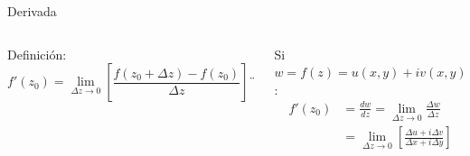 \documentclass[9pt, aspectratio=169]{beamer}
\begin{document}
\begin{frame}{Derivada}
 \begin{columns}
  \begin{alertblock}{Definición:}
   \[ f'(z_0) = \lim_{\Delta z \rightarrow 0} \left[ \frac{f(z_0 + \Delta z) - f(z_0)}{\Delta z} \right] ¨ \]
  \end{alertblock} \pause
  \vspace{2em}
  
  Si $w = f(z) = u(x, y) + i v(x, y)$:
  \begin{align*}
   f'(z_0) &= \frac{dw}{dz} = \lim_{\Delta z \rightarrow 0} \frac{\Delta w}{\Delta z} \\
           &= \lim_{\Delta z \rightarrow 0} \left[ \frac{\Delta u + i \Delta v}{\Delta x + i \Delta y} \right]
  \end{align*} \pause
  
  \includegraphics[width=0.9\textwidth]{figs/fig-04b.png}
 \end{columns}
\end{frame}
\end{document}
